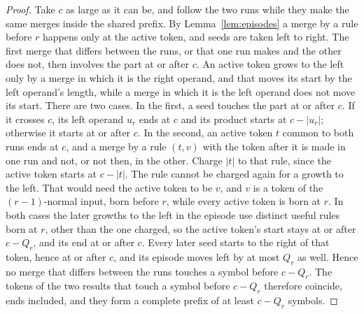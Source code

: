 \documentclass[11pt,a4paper]{article}
\theoremstyle{definition}
\theoremstyle{plain}
\begin{document}
\begin{proof}
Take \(c\) as large as it can be, and follow the two runs while they make the same merges inside the shared prefix. By
Lemma~\ref{lem:episodes} a merge by a rule before \(r\) happens only at the active token, and seeds are taken left to
right. The first merge that differs between the runs, or that one run makes and the other does not, then involves the
part at or after \(c\). An active token grows to the left only by a merge in which it is the right operand, and that
moves its start by the left operand's length, while a merge in which it is the left operand does not move its start.
There are two cases. In the first, a seed touches the part at or after \(c\). If it crosses \(c\), its left operand
\(u_r\) ends at \(c\) and its product starts at \(c - |u_r|\); otherwise it starts at or after \(c\). In the second, an
active token \(t\) common to both runs ends at \(c\), and a merge by a rule \((t, v)\) with the token after it is made
in one run and not, or not then, in the other. Charge \(|t|\) to that rule, since the active token starts at
\(c - |t|\). The rule cannot be charged again for a growth to the left. That would need the active token to be \(v\),
and \(v\) is a token of the \((r-1)\)-normal input, born before \(r\), while every active token is born at \(r\). In
both cases the later growths to the left in the episode use distinct useful rules born at \(r\), other than the one
charged, so the active token's start stays at or after \(c - Q_r\), and its end at or after \(c\). Every later seed
starts to the right of that token, hence at or after \(c\), and its episode moves left by at most \(Q_r\) as well. Hence
no merge that differs between the runs touches a symbol before \(c - Q_r\). The tokens of the two results that touch a
symbol before \(c - Q_r\) therefore coincide, ends included, and they form a complete prefix of at least \(c - Q_r\)
symbols.
\end{proof}
\end{document}
